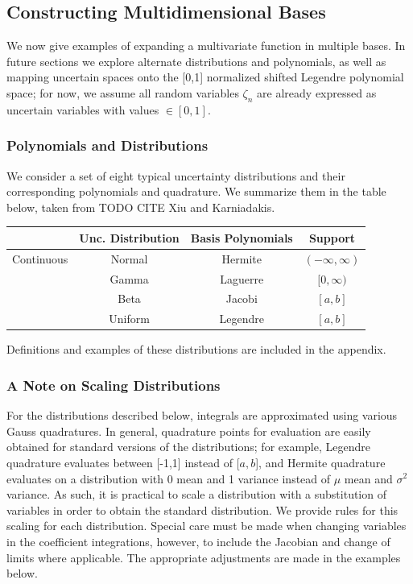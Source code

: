 \subsection{Constructing Multidimensional Bases}
We now give examples of expanding a multivariate function in multiple bases.  In future sections we explore alternate distributions and polynomials, as well as mapping uncertain spaces onto the [0,1] normalized shifted Legendre polynomial space; for now, we assume all random variables $\zeta_n$ are already expressed as uncertain variables with values $\in[0,1]$.

\subsubsection{Polynomials and Distributions}
We consider a set of eight typical uncertainty distributions and their corresponding polynomials and quadrature.  We summarize them in the table below, taken from TODO CITE Xiu and Karniadakis.  
\begin{center}
\begin{tabular}{c|c|c|c}
 & Unc. Distribution & Basis Polynomials & Support \\ \hline\hline
Continuous & Normal & Hermite & $(-\infty,\infty)$ \\
 & Gamma & Laguerre & $[0,\infty)$ \\
 & Beta & Jacobi & $[a,b]$ \\
 & Uniform & Legendre & $[a,b]$
\end{tabular}
\end{center}
Definitions and examples of these distributions are included in the appendix.
\subsubsection{A Note on Scaling Distributions}
For the distributions described below, integrals are approximated using various Gauss quadratures.  In general, quadrature points for evaluation are easily obtained for standard versions of the distributions; for example, Legendre quadrature evaluates between [-1,1] instead of [$a,b$], and Hermite quadrature evaluates on a distribution with 0 mean and 1 variance instead of $\mu$ mean and $\sigma^2$ variance.  As such, it is practical to scale a distribution with a substitution of variables in order to obtain the standard distribution.  We provide rules for this scaling for each distribution.  Special care must be made when changing variables in the coefficient integrations, however, to include the Jacobian and change of limits where applicable.  The appropriate adjustments are made in the examples below.  

